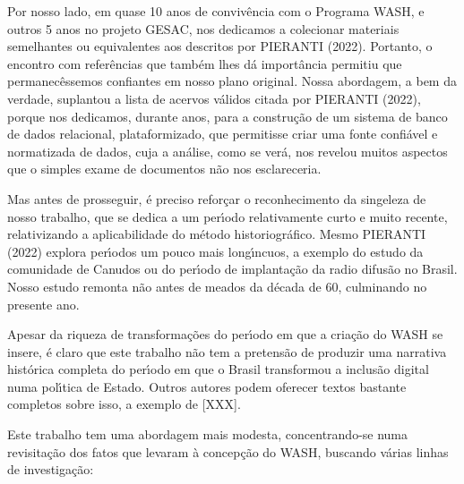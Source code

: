 \documentclass[
12pt,		%
openright,	%
twoside,  %
a4paper,			%
chapter=TITLE,		%
english,			%
french,				%
spanish,			%
brazil				%
]{USPSC-classe/USPSC}
\begin{document}
Por nosso lado, em quase 10 anos de conviv\^encia com o Programa WASH, e outros 5 anos no projeto GESAC, nos dedicamos a colecionar materiais semelhantes ou equivalentes aos descritos por PIERANTI (2022). Portanto, o encontro com refer\^encias que tamb\'em lhes d\'a import\^ancia permitiu que permanec\^essemos confiantes em nosso plano original. Nossa abordagem, a bem da verdade, suplantou a lista de acervos v\'alidos citada por  PIERANTI (2022), porque nos dedicamos, durante anos, para a constru\c{c}\~ao de um sistema de banco de dados relacional, plataformizado, que permitisse criar uma fonte confi\'avel e normatizada de dados, cuja a an\'alise, como se ver\'a, nos revelou muitos aspectos que o simples exame de documentos n\~ao nos esclareceria.









Mas antes de prosseguir, \'e preciso refor\c{c}ar o reconhecimento da singeleza de nosso trabalho, que se dedica a um per\'{\i}odo relativamente curto e muito recente, relativizando a aplicabilidade do m\'etodo historiogr\'afico. Mesmo  PIERANTI (2022) explora per\'{\i}odos um pouco mais long\'{\i}ncuos, a exemplo do estudo da comunidade de Canudos ou do per\'{\i}odo de implanta\c{c}\~ao da radio difus\~ao no Brasil. Nosso estudo remonta n\~ao antes de meados da d\'ecada de 60, culminando no presente ano.









Apesar da riqueza de transforma\c{c}\~oes do per\'{\i}odo em que a cria\c{c}\~ao do WASH se insere, \'e claro que este trabalho n\~ao tem a pretens\~ao de produzir uma narrativa hist\'orica completa do per\'{\i}odo em que o Brasil transformou a inclus\~ao digital numa pol\'{\i}tica de Estado. Outros autores podem oferecer textos bastante completos sobre isso, a exemplo de [XXX].









Este trabalho tem uma abordagem mais modesta, concentrando-se numa revisita\c{c}\~ao dos fatos que levaram \`a concep\c{c}\~ao do WASH, buscando v\'arias linhas de investiga\c{c}\~ao:
\end{document}
